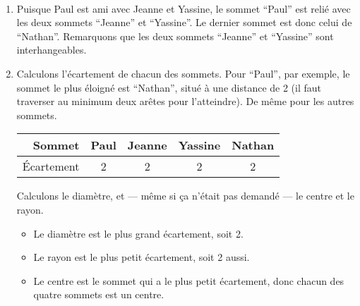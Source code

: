 \documentclass[12pt]{article}
\begin{document}
\begin{exercice}~
\begin{enumerate}
\item Puisque Paul est ami avec Jeanne et Yassine, le sommet \enquote{Paul} est relié avec les deux sommets \enquote{Jeanne} et \enquote{Yassine}. Le dernier sommet est donc celui de \enquote{Nathan}. Remarquons que les deux sommets \enquote{Jeanne} et \enquote{Yassine} sont interhangeables.
\begin{center}\end{center}
\item Calculons l'écartement de chacun des sommets.
Pour \enquote{Paul}, par exemple, le sommet le plus éloigné est \enquote{Nathan}, situé à une distance de 2 (il faut traverser au minimum deux arêtes pour l'atteindre). De même pour les autres sommets.
\begin{center}\begin{tabular}{r*{4}{c}}
\toprule
Sommet & Paul & Jeanne & Yassine & Nathan \\
\midrule
Écartement & 2 & 2 & 2 & 2\\
\bottomrule
\end{tabular}\end{center}
Calculons le diamètre, et --- même si ça n'était pas demandé --- le centre et le rayon.
\begin{itemize}
\item Le diamètre est le plus grand écartement, soit 2.
\item Le rayon est le plus petit écartement, soit 2 aussi.
\item Le centre est le sommet qui a le plus petit écartement, donc chacun des quatre sommets est un centre.
\end{itemize}
\end{enumerate}
\end{exercice}
\end{document}
